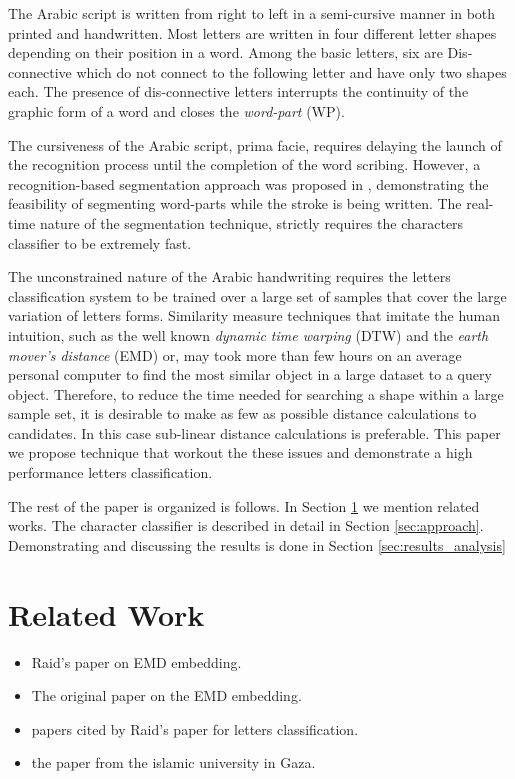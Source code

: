 \documentclass[10pt, conference, compsocconf]{IEEEtran}
\theoremstyle{definition}
\begin{document}
The Arabic script is written from right to left in a semi-cursive manner in both printed and handwritten. 
Most letters are written in four different letter shapes depending on their position in a word.
Among the basic letters, six are Dis-connective which do not connect to the following letter and have only two shapes each. 
The presence of dis-connective letters interrupts the continuity of the graphic form of a word and closes the \emph{word-part} (WP).

The cursiveness of the Arabic script, prima facie, requires delaying the launch of the recognition process until the completion of the word scribing.
However, a recognition-based segmentation approach was proposed in \cite{kour2014real}, demonstrating the feasibility of segmenting word-parts while the stroke is being written.
The real-time nature of the segmentation technique, strictly requires the characters classifier to be extremely fast.

The unconstrained nature of the Arabic handwriting requires the letters classification system to be trained over a large set of samples that cover the large variation of letters forms.
Similarity measure techniques that imitate the human intuition, such as the well known \emph{dynamic time warping} (DTW) and the \emph{earth mover's distance} (EMD) or, may took more than few hours on an average personal computer to find the most similar object in a large dataset to a query object.
Therefore, to reduce the time needed for searching a shape within a large sample set, it is desirable to make as few as possible distance calculations to candidates.
In this case sub-linear distance calculations is preferable.
This paper we propose technique that workout the these issues and demonstrate a high performance letters classification. 

The rest of the paper is organized is follows. 
In Section \ref{sec:related_work} we mention related works. 
The character classifier is described in detail in Section \ref{sec:approach}. 
Demonstrating and discussing the results is done in Section \ref{sec:results_analysis}

\section{Related Work}
\label{sec:related_work}

\begin{itemize}
\item Raid's paper on EMD embedding.
\item The original paper on the EMD embedding.
\item papers cited by Raid's paper for letters classification.
\item the paper from the islamic university in Gaza.
\end{itemize}
\end{document}
